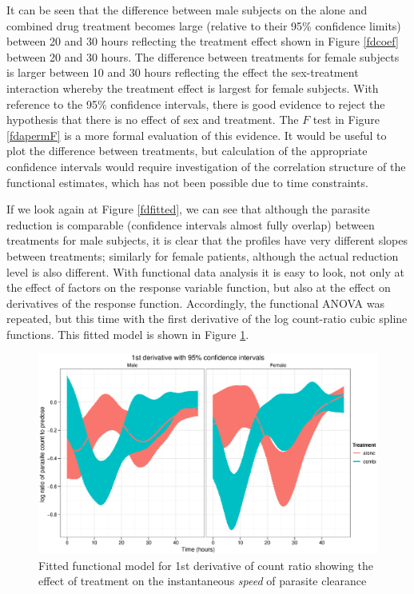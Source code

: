 It can be seen that the difference between male subjects on the alone and combined drug treatment becomes large (relative to their 95\% confidence limits) between 20 and 30 hours reflecting the treatment effect shown in Figure \ref{fdcoef} between 20 and 30 hours. The difference between treatments for female subjects is larger between 10 and 30 hours reflecting the effect the sex-treatment interaction whereby the treatment effect is largest for female subjects. With reference to the 95\% confidence intervals, there is good evidence to reject the hypothesis that there is no effect of sex and treatment. The $F$ test in Figure \ref{fdapermF} is a more formal evaluation of this evidence. It would be useful to plot the difference between treatments, but calculation of the appropriate confidence intervals would require investigation of the correlation structure of the functional estimates, which has not been possible due to time constraints.

If we look again at Figure \ref{fdfitted}, we can see that although the parasite reduction is comparable (confidence intervals almost fully overlap) between treatments for male subjects, it is clear that the profiles have very different slopes between treatments; similarly for female patients, although the actual reduction level is also different. With functional data analysis it is easy to look, not only at the effect of factors on the response variable function, but also at the effect on derivatives of the response function. Accordingly, the functional ANOVA was repeated, but this time with the first derivative of the log count-ratio cubic spline functions. This fitted model is shown in Figure \ref{fdspeed}. 
\begin{figure}[p]
\includegraphics[width=150mm]{lprr2ispeed.eps} 
\caption{Fitted functional model for 1st derivative of count ratio showing the effect of treatment on the instantaneous \emph{speed} of parasite clearance}
\label{fdspeed}
\end{figure}

